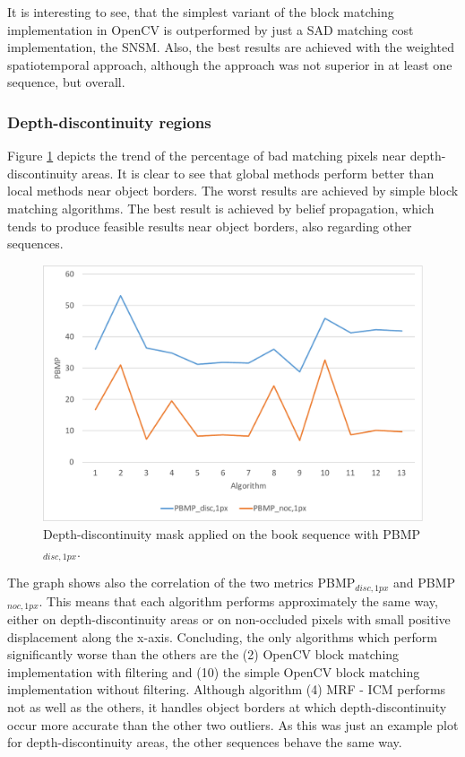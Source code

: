 \noindent It is interesting to see, that the simplest variant of the block matching implementation in OpenCV is outperformed by just a SAD matching cost implementation, the SNSM.
Also, the best results are achieved with the weighted spatiotemporal approach, although the approach was not superior in at least one sequence, but overall.

\subsubsection{Depth-discontinuity regions}

Figure \ref{fig:eval-plots-pbmp-disc1} depicts the trend of the percentage of bad matching pixels near depth-discontinuity areas.
It is clear to see that global methods perform better than local methods near object borders.
The worst results are achieved by simple block matching algorithms.
The best result is achieved by belief propagation, which tends to produce feasible results near object borders, also regarding other sequences.

\begin{figure}[h!]
\centering
\includegraphics[width=1.0\textwidth]{src/images/evaluation/plots/01-book-pbmp-disc-1.pdf}
\caption[Chart of depth-discontinuity mask]{Depth-discontinuity mask applied on the book sequence with PBMP$_{disc,1px}$.}
\label{fig:eval-plots-pbmp-disc1}
\end{figure}

\noindent The graph shows also the correlation of the two metrics PBMP$_{disc,1px}$ and PBMP$_{noc,1px}$.
This means that each algorithm performs approximately the same way, either on depth-discontinuity areas or on non-occluded pixels with small positive displacement along the x-axis.
Concluding, the only algorithms which perform significantly worse than the others are the (2) OpenCV block matching implementation with filtering and (10) the simple OpenCV block matching implementation without filtering.
Although algorithm (4) MRF - ICM performs not as well as the others, it handles object borders at which depth-discontinuity occur more accurate than the other two outliers.
As this was just an example plot for depth-discontinuity areas, the other sequences behave the same way.

